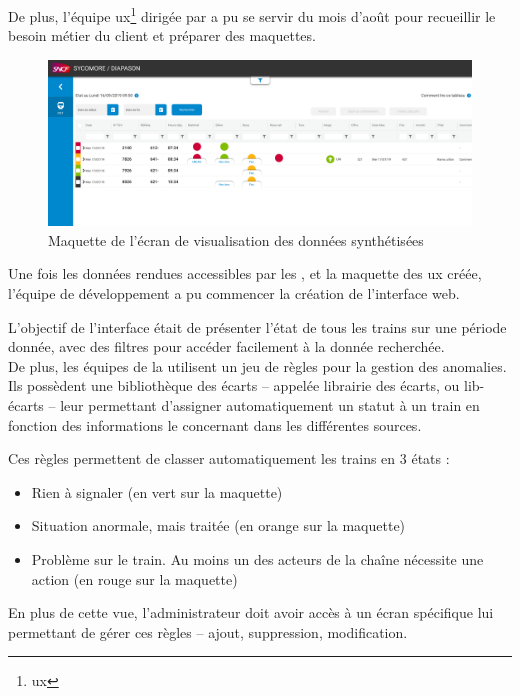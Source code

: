 De plus, l'équipe \gls{ux}\footnote{\glsdesc{ux}} dirigée par \stefan a pu se servir du mois d'août pour recueillir le besoin métier du client et préparer des maquettes.


\begin{figure}[H]
    \centering
    \includegraphics[width=1\linewidth]{img/maquette_home_page.png}
    \caption{Maquette de l'écran de visualisation des données synthétisées}
\end{figure}

Une fois les données rendues accessibles par les \ds, et la maquette des \gls{ux} créée, l'équipe de développement a pu commencer la création de l'interface web.

L'objectif de l'interface était de présenter l'état de tous les trains sur une période donnée, avec des filtres pour accéder facilement à la donnée recherchée.\\
De plus, les équipes de la \sncf utilisent un jeu de règles pour la gestion des anomalies. Ils possèdent une bibliothèque des écarts -- appelée \og librairie des écarts, ou lib-écarts -- leur permettant d'assigner automatiquement un statut à un train en fonction des informations le concernant dans les différentes sources.


Ces règles permettent de classer automatiquement les trains en 3 états :

\begin{itemize}
    \item Rien à signaler (en vert sur la maquette)
    \item Situation anormale, mais traitée (en orange sur la maquette)
    \item Problème sur le train. Au moins un des acteurs de la chaîne nécessite une action (en rouge sur la maquette)
\end{itemize}

En plus de cette vue, l'administrateur doit avoir accès à un écran spécifique lui permettant de gérer ces règles -- ajout, suppression, modification.

